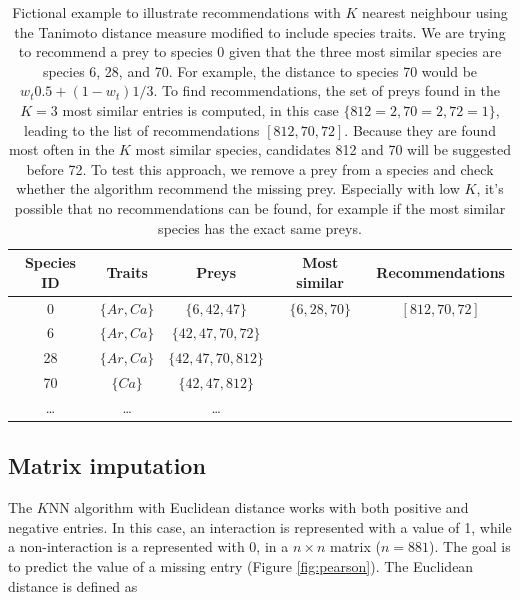 \documentclass[letterpaper]{article}
\begin{document}
\begin{table}
  \centering
  \begin{tabular}{|c|ccc|c|}
    \hline
    Species ID  & Traits          & Preys              & Most similar        & Recommendations \\
    \hline
    \hline
    0           & $\{Ar,Ca\}$     & $\{6,42,47\}$      & $\{6,28,70\}$       & $[812, 70, 72]$\\
    \hline
    6           & $\{Ar,Ca\}$     & $\{42,47,70,72\}$  &                     & \\
    28          & $\{Ar,Ca\}$     & $\{42,47,70,812\}$ &                     & \\
    70          & $\{Ca\}$        & $\{42,47,812\}$    &                     & \\
    \dots       & \dots           & \dots              &                     & \\
    \hline
  \end{tabular}

  \caption{Fictional example to illustrate recommendations with $K$ nearest
  neighbour using the Tanimoto distance measure modified to include species
  traits. We are trying to recommend a prey to species 0 given that the three
  most similar species are species 6, 28, and 70. For example, the distance to
  species 70 would be $w_t0.5 + (1 - w_t)1/3$. To find recommendations, the set
  of preys found in the $K = 3$ most similar entries is computed, in this case
  $\{812 = 2, 70 = 2, 72 = 1\}$, leading to the list of recommendations $[812,
  70, 72]$. Because they are found most often in the $K$ most similar species,
  candidates 812 and 70 will be suggested before 72. To test this approach, we
  remove a prey from a species and check whether the algorithm recommend the
  missing prey. Especially with low $K$, it's possible that no recommendations
  can be found, for example if the most similar species has the exact same
  preys.}

  \label{table:tanimoto}
\end{table}

\subsection{Matrix imputation}

The $K$NN algorithm with Euclidean distance works with both positive and
negative entries. In this case, an interaction is represented with a value of
1, while a non-interaction is a represented with 0, in a $n \times n$ matrix
($n = 881$). The goal is to predict the value of a missing entry (Figure
\ref{fig:pearson}). The Euclidean distance is defined as
\end{document}

